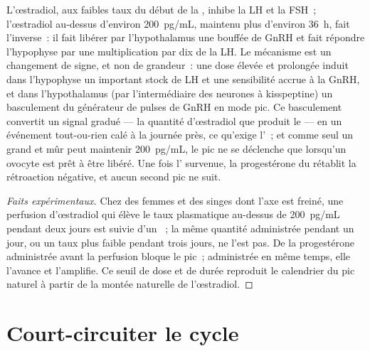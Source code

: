 \begin{theorem}\label{thm:b2:reproductive-hormones:switch}
L'œstradiol, aux faibles taux du début de la , inhibe
la LH et la FSH~; l'œstradiol au-dessus d'environ \qty{200}{pg/mL},
maintenu plus d'environ \qty{36}{h}, fait l'inverse~: il fait libérer
par l'hypothalamus une bouffée de GnRH et fait répondre l'hypophyse par
une multiplication par dix de la LH. Le mécanisme est un changement de
signe, et non de grandeur~: une dose élevée et prolongée induit dans
l'hypophyse un important stock de LH et une sensibilité accrue à la
GnRH, et dans l'hypothalamus (par l'intermédiaire des neurones à
kisspeptine) un basculement du générateur de pulses de GnRH en mode
pic. Ce basculement convertit un signal gradué --- la quantité
d'œstradiol que produit le  --- en un événement tout-ou-rien
calé à la journée près, ce qu'exige l'~; et comme seul un
 grand et mûr peut maintenir \qty{200}{pg/mL}, le pic ne se
déclenche que lorsqu'un ovocyte est prêt à être libéré. Une fois
l' survenue, la progestérone du  rétablit la
rétroaction négative, et aucun second pic ne suit.
\end{theorem}
\begin{proof}[Faits expérimentaux]
Chez des femmes et des singes dont l'axe est freiné, une perfusion
d'œstradiol qui élève le taux plasmatique au-dessus de
\qty{200}{pg/mL} pendant deux jours est suivie d'un ~; la même
quantité administrée pendant un jour, ou un taux plus faible pendant
trois jours, ne l'est pas. De la progestérone administrée avant la
perfusion bloque le pic~; administrée en même temps, elle l'avance et
l'amplifie. Ce seuil de dose et de durée reproduit le calendrier du pic
naturel à partir de la montée naturelle de l'œstradiol.
\end{proof}

\section{Court-circuiter le cycle}

